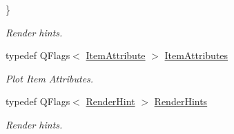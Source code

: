 \begin{DoxyCompactItemize}
 \}
\begin{DoxyCompactList}\small\item\em Render hints. \end{DoxyCompactList}\item 
typedef Q\-Flags$<$ \hyperlink{class_qwt_plot_item_ae0fabcdd35f4818ce5bbe019b0eed062}{Item\-Attribute} $>$ \hyperlink{class_qwt_plot_item_af356dc13c7838c7437334e199a356764}{Item\-Attributes}
\begin{DoxyCompactList}\small\item\em Plot Item Attributes. \end{DoxyCompactList}\item 
typedef Q\-Flags$<$ \hyperlink{class_qwt_plot_item_abe0e8a39aceef9a600b73e02550a9704}{Render\-Hint} $>$ \hyperlink{class_qwt_plot_item_a40cf900701d3a68948b00316689616d1}{Render\-Hints}
\begin{DoxyCompactList}\small\item\em Render hints. \end{DoxyCompactList}\end{DoxyCompactItemize}
